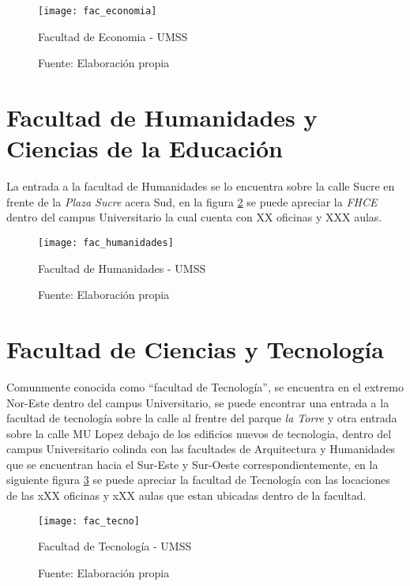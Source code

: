       \begin{figure}[H]
       \begin{center}
         \texttt{[image: fac\_economia]}
         \caption{Facultad de Economia - UMSS}
         \label{fig:fac_economia}
         \caption*{Fuente: Elaboración propia}
       \end{center}
      \end{figure}






\section{Facultad de Humanidades y Ciencias de la Educación}
\label{sec:facultad_humanidades}

La entrada a la facultad de Humanidades se lo encuentra sobre la calle Sucre en frente de la \emph{Plaza Sucre} acera Sud, en la figura \ref{fig:fac_humanidades} se puede apreciar la \emph{FHCE} dentro del campus Universitario la cual cuenta con XX oficinas y XXX aulas.

\begin{figure}[H]
 \begin{center}
   \texttt{[image: fac\_humanidades]}
   \caption{Facultad de Humanidades - UMSS}
   \label{fig:fac_humanidades}
   \caption*{Fuente: Elaboración propia}
 \end{center}
\end{figure}


\section{Facultad de Ciencias y Tecnología}
\label{sec:facultad_tecnologia}

Comunmente conocida como ``facultad de Tecnología'',  se encuentra en el extremo Nor-Este dentro del campus Universitario, se puede encontrar una entrada a la facultad de tecnología sobre la calle  al frentre del parque \emph{la Torre} y otra entrada sobre la calle MU Lopez debajo de los edificios nuevos de tecnologia, dentro del campus Universitario colinda con las facultades de Arquitectura y Humanidades que se encuentran hacia el Sur-Este y Sur-Oeste correspondientemente, en la siguiente figura \ref{fig:fac_tecno} se puede apreciar la facultad de Tecnología con las locaciones de las xXX oficinas y xXX aulas que estan ubicadas dentro de la facultad.

\begin{figure}[H]
 \begin{center}
   \texttt{[image: fac\_tecno]}
   \caption{Facultad de Tecnología - UMSS}
   \label{fig:fac_tecno}
   \caption*{Fuente: Elaboración propia}
 \end{center}
\end{figure}

